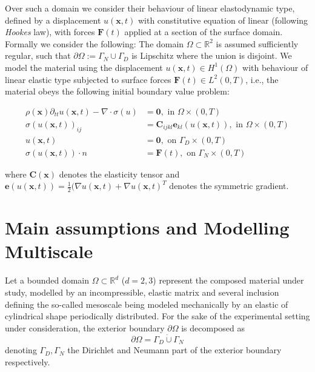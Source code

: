 Over such a domain we consider their behaviour of linear elastodynamic type, defined by a displacement $u(\mathbf{x},t)$ with constitutive equation of linear (following \textit{Hookes} law), with forces $\mathbf{F}(t)$ applied at a section of the surface domain. \\

Formally we consider the following:
The domain $\Omega \subset \mathbb{R}^2$ is assumed sufficiently regular, such that $\partial \Omega := \Gamma_N \cup \Gamma_D$ is Lipschitz where the union is disjoint.
We model the material using the displacement $u(\mathbf{x},t) \in H^1(\Omega)$ with behaviour of linear elastic type subjected to surface forces $\mathbf{F}(t) \in L^2 (0, T)$, i.e., the material obeys the following initial boundary value problem:

\begin{align*}
    \rho (\mathbf{x}) \partial_{tt} u(\mathbf{x},t) - \nabla \cdot \sigma (u) & = \mathbf{0}, \text{ in } \Omega \times (0, T) \\
    \sigma(u(\mathbf{x},t))_{ij} &= \mathbf{C}_{ijkl} \mathbf{e}_{kl}(u(\mathbf{x},t)), \text{ in } \Omega \times (0, T) \\
    u(\mathbf{x},t) &= \mathbf{0}, \text{ on } \Gamma_D \times (0, T) \\
    \sigma(u(\mathbf{x},t)) \cdot n &= \mathbf{F}(t), \text{ on } \Gamma_N \times (0,T)
\end{align*}

where $\mathbf{C}(\mathbf{x})$ denotes the elasticity tensor and $\mathbf{e}(u(\mathbf{x},t)) = \frac{1}{2}\big( \nabla u(\mathbf{x},t) + \nabla u(\mathbf{x},t)^{T}$ denotes the symmetric gradient.

\section{Main assumptions and Modelling Multiscale}
Let a bounded domain $\Omega \subset \mathbb{R}^d$ ($d = 2,3$) represent the composed material under study, modelled by an incompressible, elastic matrix and several inclusion defining the so-called mesoscale being modeled mechanically by an elastic of cylindrical shape periodically distributed.
For the sake of the experimental setting under consideration, the exterior boundary $\partial \Omega$ is decomposed as
\begin{equation*}
	\partial \Omega = \Gamma_D \dot\cup \Gamma_N
\end{equation*}
denoting $\Gamma_D, \Gamma_N$ the Dirichlet and Neumann part of the exterior boundary respectively.

